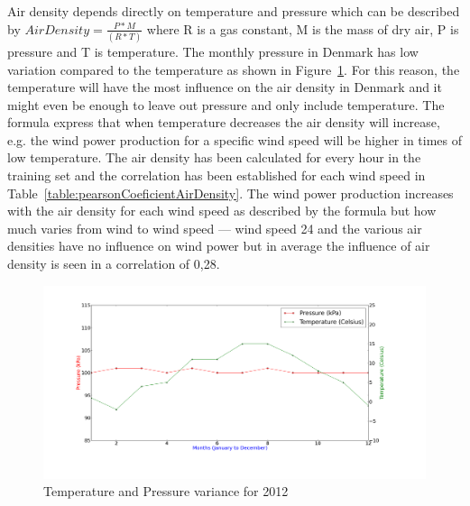 Air density depends directly on temperature and pressure which can be described by $Air Density=\frac{P*M}{(R*T)}$ where R is a gas constant, M is the mass of dry air, P is pressure and T is temperature. The monthly pressure in Denmark has low variation compared to the temperature as shown in Figure~\ref{fig:pressureTemperatureVariance}. For this reason, the temperature will have the most influence on the air density in Denmark and it might even be enough to leave out pressure and only include temperature. The formula express that when temperature decreases the air density will increase, e.g. the wind power production for a specific wind speed will be higher in times of low temperature. The air density has been calculated for every hour in the training set and the correlation has been established for each wind speed in Table~\ref{table:pearsonCoeficientAirDensity}. The wind power production increases with the air density for each wind speed as described by the formula but how much varies from wind to wind speed --- wind speed 24 and the various air densities have no influence on wind power but in average the influence of air density is seen in a correlation of 0,28.

\begin{figure}[H]
\centering
\includegraphics[width=0.95\linewidth]{billeder/pressureTemperatureVariance.png}
\caption{Temperature and Pressure variance for 2012}
\label{fig:pressureTemperatureVariance}
\end{figure}

